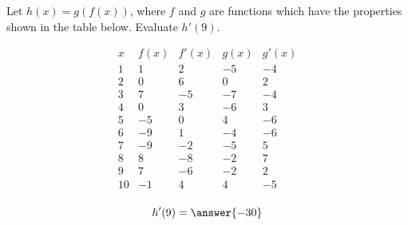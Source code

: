 \documentclass{ximera}
\author{Steven Gubkin}
\begin{document}
\begin{exercise}


Let $h(x) = g(f(x))$, where $f$ and $g$ are functions which have the properties shown in the table below.  Evaluate $h'(9)$.

\[
\begin{array}{c|c|c|c|c}
 x & f(x) & f'(x) & g(x) & g'(x)\\ \hline
1 & 1 & 2 & -5 & -4\\
2 & 0 & 6 & 0 & 2\\
3 & 7 & -5 & -7 & -4\\
4 & 0 & 3 & -6 & 3\\
5 & -5 & 0 & 4 & -6\\
6 & -9 & 1 & -4 & -6\\
7 & -9 & -2 & -5 & 5\\
8 & 8 & -8 & -2 & 7\\
9 & 7 & -6 & -2 & 2\\
10 & -1 & 4 & 4 & -5\\
\end{array}
\]


\begin{prompt}
	$$h'(9) = \answer{-30}$$
\end{prompt}


\end{exercise}
\end{document}
